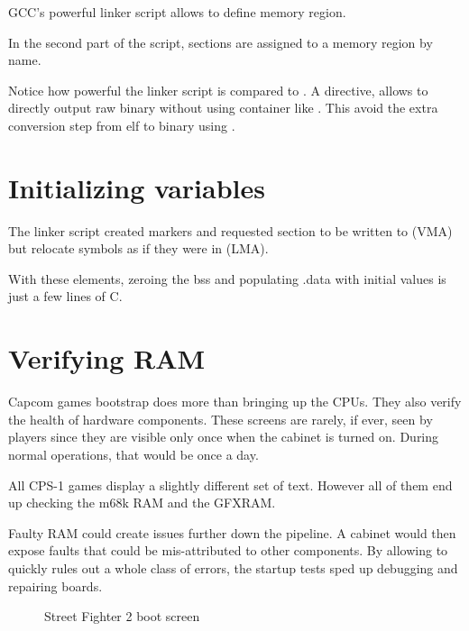  GCC's powerful linker script allows to define memory region.





In the second part of the script, sections are assigned to a memory region by name.



\begin{trivia}
Notice how powerful the linker script is compared to . A directive,  allows to directly output raw binary without using container like . This avoid the extra conversion step from elf to binary using .
\end{trivia}

\section{Initializing variables}
The linker script created markers and requested section  to be written to  (VMA) but relocate symbols as if they were in  (LMA).

With these elements, zeroing the bss and populating .data with initial values is just a few lines of C.



\section{Verifying RAM}
Capcom games bootstrap does more than bringing up the CPUs. They also verify the health of hardware components. These screens are rarely, if ever, seen by players since they are visible only once when the cabinet is turned on. During normal operations, that would be once a day.

All CPS-1 games display a slightly different set of text. However all of them end up checking the m68k RAM and the GFXRAM. 

Faulty RAM could create issues further down the pipeline. A cabinet would then expose faults that could be mis-attributed to other components. By allowing to quickly rules out a whole class of errors, the startup tests sped up debugging and repairing boards.



\vfill
\begin{figure}[H]
\caption*{Street Fighter 2 boot screen}
\end{figure}


